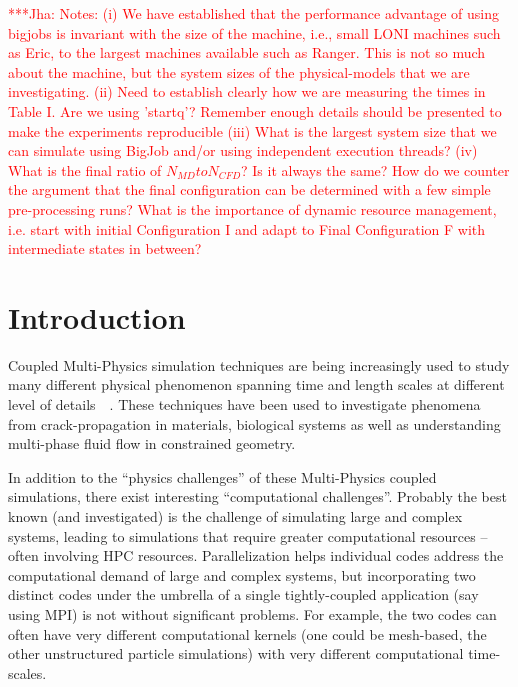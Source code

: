 \documentclass[conference,final]{IEEEtran}
\newcommand{\jhanote}[1]{ {\textcolor{red} { ***Jha: #1 }}}
\newcommand{\jhanote}[1]{}
\begin{document}
\jhanote{Notes: (i) We have established that the performance advantage
  of using bigjobs is invariant with the size of the machine, i.e.,
  small LONI machines such as Eric, to the largest machines available
  such as Ranger. This is not so much about the machine, but the
  system sizes of the physical-models that we are investigating. (ii)
  Need to establish clearly how we are measuring the times in Table
  I. Are we using 'startq'? Remember enough details should be
  presented to make the experiments reproducible (iii) What is the
  largest system size that we can simulate using BigJob and/or using
  independent execution threads? (iv) What is the final ratio of
  $N_{MD} to N_{CFD}$? Is it always the same? How do we counter the
  argument that the final configuration can be determined with a few
  simple pre-processing runs? What is the importance of dynamic
  resource management, i.e. start with initial Configuration I and
  adapt to Final Configuration F with intermediate states in between?
}


\section{Introduction}

Coupled Multi-Physics simulation techniques are being increasingly
used to study many different physical phenomenon spanning time and
length scales at different level of
details~\cite{Tai}~\cite{Watanabe}. These techniques have been used to
investigate phenomena from crack-propagation in materials, biological
systems as well as understanding multi-phase fluid flow in constrained
geometry.

In addition to the ``physics challenges'' of these Multi-Physics
coupled simulations, there exist interesting ``computational
challenges''. Probably the best known (and investigated) is the
challenge of simulating large and complex systems, leading to
simulations that require greater computational resources -- often
involving HPC resources. %
Parallelization helps individual codes address the computational
demand of large and complex systems, but incorporating two distinct
codes under the umbrella of a single tightly-coupled application (say
using MPI) is not without significant problems. For example, the two
codes can often have very different computational kernels (one could
be mesh-based, the other unstructured particle simulations) with very
different computational time-scales.
\end{document}
